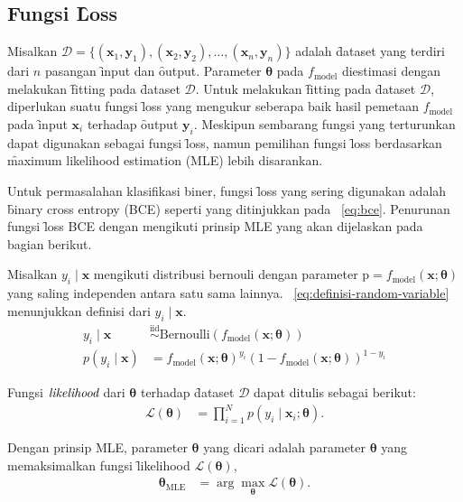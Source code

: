     \subsection{Fungsi \f{Loss}}
    Misalkan $\mathcal{D} = \{(\mathbf{x}_1, \mathbf{y}_1), (\mathbf{x}_2, \mathbf{y}_2), \dots, (\mathbf{x}_n, \mathbf{y}_n)\}$ adalah \f{dataset} yang terdiri dari $n$ pasangan \f{input} dan \f{output}. Parameter $\bm{\theta}$ pada $f_{\text{model}}$ diestimasi dengan melakukan \f{fitting} pada \f{dataset} $\mathcal{D}$. Untuk melakukan \f{fitting} pada \f{dataset} $\mathcal{D}$, diperlukan suatu fungsi \f{loss} yang mengukur seberapa baik hasil pemetaan $f_{\text{model}}$ pada \f{input} $\mathbf{x}_i$ terhadap \f{output} $\mathbf{y}_i$. Meskipun sembarang fungsi yang terturunkan dapat digunakan sebagai fungsi \f{loss}, namun pemilihan fungsi \f{loss} berdasarkan \f{maximum likelihood estimation} (MLE) lebih disarankan. 
    
    Untuk permasalahan klasifikasi biner, fungsi \f{loss} yang sering digunakan adalah \f{binary cross entropy} (BCE) seperti yang ditinjukkan pada \equ~\ref{eq:bce}. Penurunan fungsi \f{loss} BCE dengan mengikuti prinsip MLE yang akan dijelaskan pada bagian berikut.
    
    Misalkan $y_i \mid \mathbf{x}$ mengikuti distribusi bernouli dengan parameter $\text{p} = f_{\text{model}}(\mathbf{x};\bm{\theta})$ yang saling independen antara satu sama lainnya. \equ~\ref{eq:definisi-random-variable} menunjukkan definisi dari $y_i \mid \mathbf{x}$.
    \begin{align}
        \label{eq:definisi-random-variable}
        y_i \mid \mathbf{x} &\overset{\text{iid}}{\sim} \text{Bernoulli}(f_{\text{model}}(\mathbf{x};\bm{\theta})) \\
        p(y_i \mid \mathbf{x}) &= f_{\text{model}}(\mathbf{x};\bm{\theta})^{y_i} (1 - f_{\text{model}}(\mathbf{x};\bm{\theta}))^{1 - y_i} 
    \end{align} 

    Fungsi $\textit{likelihood}$ dari $\bm{\theta}$ terhadap \f{dataset} $\mathcal{D}$ dapat ditulis sebagai berikut:
    \begin{align}
        \mathcal{L}(\bm{\theta}) &= \prod_{i=1}^N p(y_i \mid \mathbf{x}_i; \bm{\theta}).
    \end{align}

    Dengan prinsip MLE, parameter $\bm{\theta}$ yang dicari adalah parameter $\bm{\theta}$ yang memaksimalkan fungsi \f{likelihood} $\mathcal{L}(\bm{\theta})$,
    \begin{align}
        \bm{\theta}_{\text{MLE}} &= \arg\max_{\bm{\theta}} \mathcal{L}(\bm{\theta}).
    \end{align}

